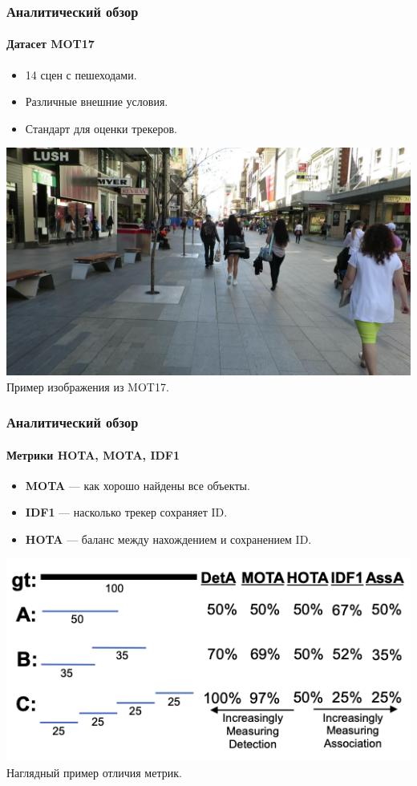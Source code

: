 \documentclass{beamer} %
\begin{document}
\begin{frame}
  \frametitle{Аналитический обзор}
  \framesubtitle{Датасет MOT17}
  \begin{itemize}
    \item 14 сцен с пешеходами.
    \item Различные внешние условия.
    \item Стандарт для оценки трекеров.
  \end{itemize}
  \centering
  \includegraphics[width=0.7\linewidth]{images/review/MOT17_1.jpg}\\
  \small Пример изображения из MOT17.
\end{frame}

\begin{frame}
  \frametitle{Аналитический обзор}
  \framesubtitle{Метрики HOTA, MOTA, IDF1}
  \begin{itemize}
    \item \textbf{MOTA} — как хорошо найдены все объекты.
    \item \textbf{IDF1} — насколько трекер сохраняет ID.
    \item \textbf{HOTA} — баланс между нахождением и сохранением ID.
  \end{itemize}
  \centering
  \includegraphics[width=0.7\linewidth]{images/presentation/metrics.png}\\
  \small Наглядный пример отличия метрик.
\end{frame}
\end{document}
